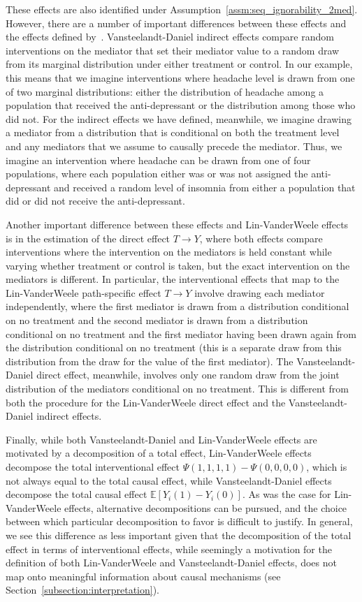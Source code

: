 These effects are also identified under Assumption~\ref{assm:seq_ignorability_2med}. However,
there are a number of important differences between these effects and the effects defined 
by~\cite{linvanderweele2017}. Vansteelandt-Daniel indirect effects compare random interventions 
on the mediator that set 
their mediator value to a random draw from its marginal distribution under either treatment or
control. In our example, this means that we imagine interventions where headache level is drawn from 
one of two marginal distributions: either the distribution of headache among a population that 
received the anti-depressant or the distribution among those who did not. For the indirect effects we 
have defined, meanwhile, we imagine drawing a mediator from a 
distribution that is conditional on both the treatment level and any mediators that we assume to 
causally precede the mediator. Thus, we imagine an intervention where headache can be drawn from 
one of four populations, where each population either was or was not assigned the anti-depressant and 
received a random level of insomnia from either a population that did or did not 
receive the anti-depressant. 

Another important difference between these effects and Lin-VanderWeele effects is in the estimation of 
the direct effect $T \rightarrow Y$, where 
both effects compare interventions where the intervention on the mediators is held constant while
varying whether treatment or control is taken, but the exact intervention on the mediators is 
different. In particular, the interventional effects that map to the Lin-VanderWeele path-specific effect 
$T \rightarrow Y$ involve drawing each mediator independently, where the first mediator is drawn
from a distribution conditional on no treatment and the second mediator is drawn from a distribution
conditional on no treatment and the first mediator having been drawn again from the distribution
conditional on no treatment (this is a separate draw from this distribution from the draw
for the value of the first mediator). The Vansteelandt-Daniel direct effect, meanwhile, involves 
only one random draw from the joint distribution of the mediators conditional on no treatment. 
This is different from both the procedure for the Lin-VanderWeele direct effect and the 
Vansteelandt-Daniel indirect effects. 

Finally, while both Vansteelandt-Daniel and Lin-VanderWeele effects are motivated by a decomposition of a total 
effect, Lin-VanderWeele effects
decompose the total interventional effect $\Psi(1,1,1,1) - \Psi(0,0,0,0)$, which is not always equal to the total
causal effect, while Vansteelandt-Daniel effects 
decompose the total causal effect $\mathbb{E}[Y_{i}(1) - Y_{i}(0)]$. As was the case for Lin-VanderWeele effects,
alternative decompositions can be pursued, and the choice between which particular decomposition to favor 
is difficult to justify. In general, we see this difference as less important given that the decomposition of 
the total effect in terms of interventional effects, while seemingly a motivation for the definition of both 
Lin-VanderWeele and Vansteelandt-Daniel effects, does not map onto meaningful information about causal 
mechanisms (see Section~\ref{subsection:interpretation}). 


